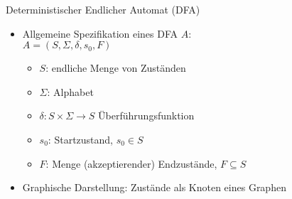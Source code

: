 \begin{frame}{Deterministischer Endlicher Automat (DFA)}
	\begin{itemize}
		\item Allgemeine Spezifikation eines DFA $A$:\\
		$A=\left(S, \Sigma, \delta, s_0, F\right)$
		\begin{itemize}
			\item $S$: endliche Menge von Zuständen
			\item $\Sigma$: Alphabet
			\item $\delta:S \times \Sigma \rightarrow S$ Überführungsfunktion
			\item $s_0$: Startzustand, $s_0 \in S$
			\item $F$: Menge (akzeptierender) Endzustände, $F \subseteq S$
		\end{itemize}
		\item Graphische Darstellung: Zustände als Knoten eines Graphen\\
		\vspace{1em}
	\end{itemize}
\end{frame}

